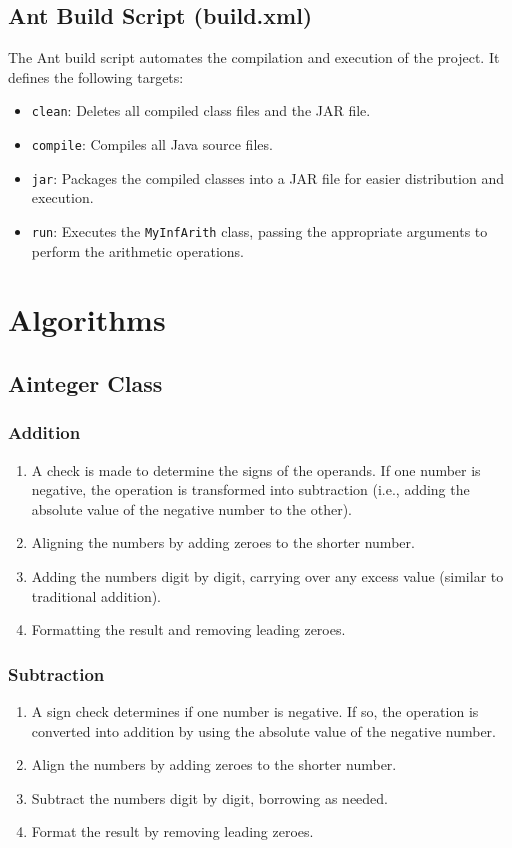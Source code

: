 \documentclass[12pt]{article}
\begin{document}
\subsection{Ant Build Script (build.xml)}
The Ant build script automates the compilation and execution of the project. It defines the following targets:
\begin{itemize}
    \item \texttt{clean}: Deletes all compiled class files and the JAR file.
    \item \texttt{compile}: Compiles all Java source files.
    \item \texttt{jar}: Packages the compiled classes into a JAR file for easier distribution and execution.
    \item \texttt{run}: Executes the \texttt{MyInfArith} class, passing the appropriate arguments to perform the arithmetic operations.
\end{itemize}

\section{Algorithms}

\subsection{Ainteger Class}

\subsubsection{Addition}
\begin{enumerate}
    \item A check is made to determine the signs of the operands. If one number is negative, the operation is transformed into subtraction (i.e., adding the absolute value of the negative number to the other).
    \item Aligning the numbers by adding zeroes to the shorter number.
    \item Adding the numbers digit by digit, carrying over any excess value (similar to traditional addition).
    \item Formatting the result and removing leading zeroes.
\end{enumerate}

\subsubsection{Subtraction}
\begin{enumerate}
    \item A sign check determines if one number is negative. If so, the operation is converted into addition by using the absolute value of the negative number.
    \item Align the numbers by adding zeroes to the shorter number.
    \item Subtract the numbers digit by digit, borrowing as needed.
    \item Format the result by removing leading zeroes.
\end{enumerate}
\end{document}
